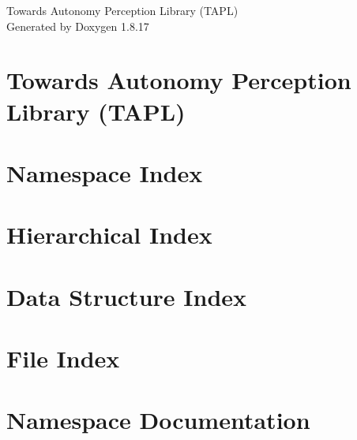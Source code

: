 \let\mypdfximage\pdfximage\def\pdfximage{\immediate\mypdfximage}\documentclass[twoside]{book}
\newcommand{\+}{\discretionary{\mbox{\scriptsize$\hookleftarrow$}}{}{}}
\newcommand{\clearemptydoublepage}{%
  \newpage{\pagestyle{empty}\cleardoublepage}%
}
\begin{document}
\hypersetup{pageanchor=false,
             bookmarksnumbered=true,
             pdfencoding=unicode
            }
\begin{titlepage}
\vspace*{7cm}
\begin{center}%
{\Large Towards Autonomy Perception Library (T\+A\+PL) }\\
\vspace*{1cm}
{\large Generated by Doxygen 1.8.17}\\
\end{center}
\end{titlepage}
\clearemptydoublepage
{}
\tableofcontents
\clearemptydoublepage
{}
\hypersetup{pageanchor=true}

\chapter{Towards Autonomy Perception Library (T\+A\+PL)}
\label{index}\hypertarget{index}{}
\chapter{Namespace Index}

\chapter{Hierarchical Index}

\chapter{Data Structure Index}

\chapter{File Index}

\chapter{Namespace Documentation}








\end{document}
